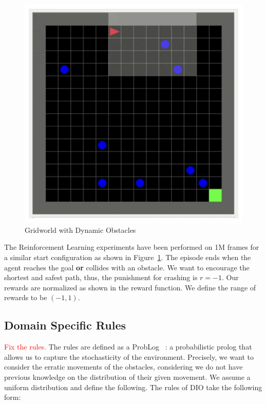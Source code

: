 \begin{multicols}{2}[\medskip]
    \begin{figure}[H]
      \centering
      \includegraphics[scale=0.55]{figures/gridworldrl.png}
      \caption{Gridworld with Dynamic Obstacles}
      \label{fig:gridrl}
    \end{figure}
    \columnbreak
    The Reinforcement Learning experiments have been performed on 1M
    frames for a similar start configuration as shown in Figure~\ref{fig:gridrl}. The episode ends when the agent 
    reaches the goal \textbf{or} collides with an obstacle. We want to encourage the shortest and safest path, thus, the punishment for crashing is $r = -1$. Our rewards are normalized as shown in
    the reward function. We define the range of rewards to be $(-1,1)$. 
\end{multicols}

\subsection{Domain Specific Rules}
\textcolor{red}{Fix the rules.}
The rules are defined as a ProbLog~\cite{problog} 
: a probabilistic prolog that allows us to capture 
the stochasticity of the environment. Precisely, we want to consider the erratic movements of the obstacles, considering 
we do not have previous knowledge on the distribution of their given movement. We assume a uniform distribution and define the following. 
The rules of DIO take the following form: 


